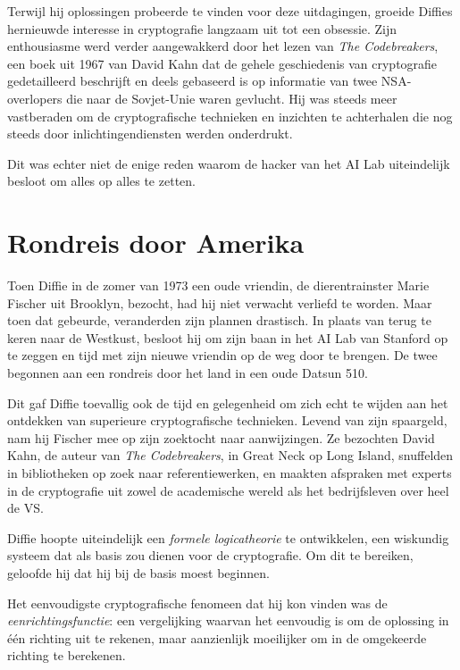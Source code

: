 \documentclass[
  a5paper,
  smalldemyvopaper,11pt,twoside,onecolumn,openright,extrafontsizes,
hidelinks]{memoir}
\begin{document}
Terwijl hij oplossingen probeerde te vinden voor deze uitdagingen,
groeide Diffies hernieuwde interesse in cryptografie langzaam uit tot
een obsessie. Zijn enthousiasme werd verder aangewakkerd door het lezen
van \emph{The Codebreakers}, een boek uit 1967 van David Kahn dat de
gehele geschiedenis van cryptografie gedetailleerd beschrijft en deels
gebaseerd is op informatie van twee NSA-overlopers die naar de
Sovjet-Unie waren gevlucht. Hij was steeds meer vastberaden om de
cryptografische technieken en inzichten te achterhalen die nog steeds
door inlichtingendiensten werden onderdrukt.

Dit was echter niet de enige reden waarom de hacker van het AI Lab
uiteindelijk besloot om alles op alles te zetten.

\section{Rondreis door Amerika}\label{rondreis-door-amerika}

Toen Diffie in de zomer van 1973 een oude vriendin, de dierentrainster
Marie Fischer uit Brooklyn, bezocht, had hij niet verwacht verliefd te
worden. Maar toen dat gebeurde, veranderden zijn plannen drastisch. In
plaats van terug te keren naar de Westkust, besloot hij om zijn baan in
het AI Lab van Stanford op te zeggen en tijd met zijn nieuwe vriendin op
de weg door te brengen. De twee begonnen aan een rondreis door het land
in een oude Datsun 510.

Dit gaf Diffie toevallig ook de tijd en gelegenheid om zich echt te
wijden aan het ontdekken van superieure cryptografische technieken.
Levend van zijn spaargeld, nam hij Fischer mee op zijn zoektocht naar
aanwijzingen. Ze bezochten David Kahn, de auteur van \emph{The
Codebreakers}, in Great Neck op Long Island, snuffelden in bibliotheken
op zoek naar referentiewerken, en maakten afspraken met experts in de
cryptografie uit zowel de academische wereld als het bedrijfsleven over
heel de VS.

Diffie hoopte uiteindelijk een \emph{formele logicatheorie} te
ontwikkelen, een wiskundig systeem dat als basis zou dienen voor de
cryptografie. Om dit te bereiken, geloofde hij dat hij bij de basis
moest beginnen.

Het eenvoudigste cryptografische fenomeen dat hij kon vinden was de
\emph{eenrichtingsfunctie}: een vergelijking waarvan het eenvoudig is om
de oplossing in één richting uit te rekenen, maar aanzienlijk moeilijker
om in de omgekeerde richting te berekenen.
\end{document}
